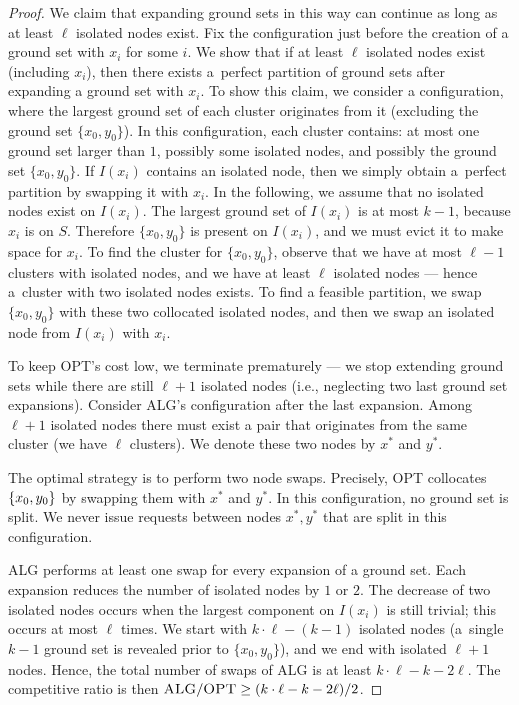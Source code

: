 \documentclass[a4paper,anonymous,USenglish]{lipics-v2019}
\newcommand{\OPT}{\textsc{OPT}\xspace}
\newcommand{\ALG}{\textsc{ALG}\xspace}
\DeclarePairedDelimiter\set{\{}{\}}
\begin{document}
\begin{proof}
	We claim that expanding ground sets in this way can continue as long as at least $\ell$ isolated nodes exist.
	Fix the configuration just before the creation of a ground set with $x_i$ for some $i$.
	We show that if at least $\ell$ isolated nodes exist (including $x_i$), then there exists a~perfect partition of ground sets after expanding a ground set with $x_i$.
	To show this claim, we consider a configuration, where the largest ground set of each cluster originates from it (excluding the ground set $\{x_0, y_0\}$).
	In this configuration, each cluster contains:  at most one ground set larger than $1$, possibly some isolated nodes, and possibly the ground set $\{x_0, y_0\}$.
	If $I(x_i)$ contains an isolated node, then we simply obtain a~perfect partition by swapping it with $x_i$.
	In the following, we assume that no isolated nodes exist on $I(x_i)$.
	The largest ground set of $I(x_i)$ is at most $k-1$, because $x_i$ is on $S$.
	Therefore $\{x_0, y_0\}$ is present on $I(x_i)$, and we must evict it to make space for $x_i$.
	To find the cluster for $\{x_0, y_0\}$, observe that we have at most $\ell-1$ clusters with isolated nodes, and we have at least $\ell$ isolated nodes --- hence a~cluster with two isolated nodes exists.
	To find a feasible partition, we swap $\{x_0, y_0\}$ with these two collocated isolated nodes, and then we swap an isolated node from $I(x_i)$ with $x_i$.
	

	To keep \OPT's cost low, we terminate prematurely --- we stop extending ground sets while there are still $\ell+1$ isolated nodes (i.e., neglecting two last ground set expansions).
	Consider \ALG's configuration after the last expansion.
	Among $\ell+1$ isolated nodes there must exist a pair that originates from the same cluster (we have $\ell$ clusters). 
	We denote these two nodes by $x^*$ and $y^*$.

	The optimal strategy is to perform two node swaps.
	Precisely, \OPT collocates $\set{x_0,y_0}$ by swapping them with $x^*$ and $y^*$.
	In this configuration, no ground set is split.
	We never issue requests between nodes $x^*, y^*$ that are split in this configuration.


	\ALG performs at least one swap for every expansion of a ground set.
	Each expansion reduces the number of isolated nodes by $1$ or $2$.
	The decrease of two isolated nodes occurs when the largest component on  $I(x_i)$ is still trivial; this occurs at most $\ell$ times.
	We start with $k \cdot \ell - (k-1)$ isolated nodes (a~single $k-1$ ground set is revealed prior to $\{x_0, y_0\}$), and we end with isolated $\ell+1$ nodes.
	Hence, the total number of swaps of \ALG is at least $k\cdot \ell - k - 2 \ell$.
	The competitive ratio is then $\ALG / \OPT \geq (k\cdot \ell - k - 2\ell) / 2$.
\end{proof}
\end{document}
